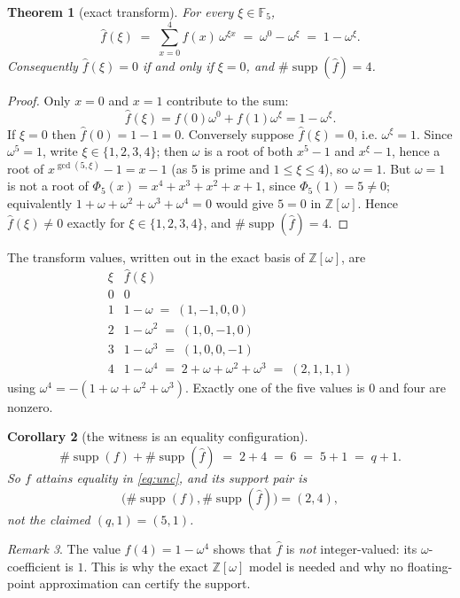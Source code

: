 \documentclass[11pt]{article}
\newtheorem{theorem}{Theorem}
\newtheorem{corollary}[theorem]{Corollary}
\theoremstyle{definition}
\theoremstyle{remark}
\newtheorem{remark}[theorem]{Remark}
\newcommand{\F}{\mathbb{F}}
\newcommand{\Z}{\mathbb{Z}}
\newcommand{\supp}{\operatorname{supp}}
\newcommand{\fh}{\widehat{f}}
\begin{document}
\begin{theorem}[exact transform]\label{thm:fhat}
For every $\xi\in\F_5$,
\[
\fh(\xi) \;=\; \sum_{x=0}^{4} f(x)\,\omega^{\xi x}
\;=\; \omega^{0}- \omega^{\xi}
\;=\; 1-\omega^{\xi}.
\]
Consequently $\fh(\xi)=0$ if and only if $\xi=0$, and $\#\supp(\fh)=4$.
\end{theorem}

\begin{proof}
Only $x=0$ and $x=1$ contribute to the sum:
\[
\fh(\xi)=f(0)\omega^{0}+f(1)\omega^{\xi}=1-\omega^{\xi}.
\]
If $\xi=0$ then $\fh(0)=1-1=0$. Conversely suppose $\fh(\xi)=0$, i.e.
$\omega^{\xi}=1$. Since $\omega^5=1$, write $\xi\in\{1,2,3,4\}$; then $\omega$
is a root of both $x^5-1$ and $x^{\xi}-1$, hence a root of
$x^{\gcd(5,\xi)}-1=x-1$ (as $5$ is prime and $1\le\xi\le4$), so $\omega=1$.
But $\omega=1$ is not a root of $\Phi_5(x)=x^4+x^3+x^2+x+1$, since
$\Phi_5(1)=5\ne0$; equivalently $1+\omega+\omega^2+\omega^3+\omega^4=0$ would
give $5=0$ in $\Z[\omega]$. Hence $\fh(\xi)\ne0$ exactly for
$\xi\in\{1,2,3,4\}$, and $\#\supp(\fh)=4$.
\end{proof}

The transform values, written out in the exact basis of $\Z[\omega]$, are
\[
\begin{array}{c|c}
\xi & \fh(\xi) \\ \hline
0 & 0 \\
1 & 1-\omega \;=\; (1,-1,0,0) \\
2 & 1-\omega^2 \;=\; (1,0,-1,0) \\
3 & 1-\omega^3 \;=\; (1,0,0,-1) \\
4 & 1-\omega^4 \;=\; 2+\omega+\omega^2+\omega^3 \;=\; (2,1,1,1)
\end{array}
\]
using $\omega^4=-(1+\omega+\omega^2+\omega^3)$. Exactly one of the five
values is $0$ and four are nonzero.

\begin{corollary}[the witness is an equality configuration]\label{cor:eq}
\[
\#\supp(f)+\#\supp(\fh) \;=\; 2+4 \;=\; 6 \;=\; 5+1 \;=\; q+1 .
\]
So $f$ attains equality in \eqref{eq:unc}, and its support pair is
\[
\bigl(\#\supp(f),\#\supp(\fh)\bigr)=(2,4),
\]
not the claimed $(q,1)=(5,1)$.
\end{corollary}

\begin{remark}
The value $\fh(4)=1-\omega^4$ shows that $\fh$ is \emph{not} integer-valued:
its $\omega$-coefficient is $1$. This is why the exact $\Z[\omega]$ model is
needed and why no floating-point approximation can certify the support.
\end{remark}
\end{document}
